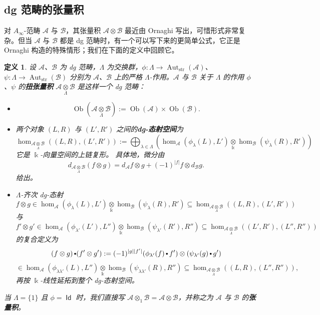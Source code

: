 \documentclass[11pt,a4paper]{article}
\renewcommand{\emph}[1]{{\bfseries #1}}
\DeclareMathOperator{\id}{\mathsf{Id}}
\DeclareMathOperator{\Aut}{Aut}
\DeclareMathOperator{\Ob}{Ob}
\DeclareMathOperator{\field}{\mathbb{k}}
\DeclareMathOperator{\str}{\operatorname{str}}
\DeclareMathOperator{\comp}{\vcenter{\hbox{\scalebox{0.65}{$\bullet$}}}}
\theoremstyle{cnth}
\newtheorem{dfn}[thm]{定义}
\begin{document}
\subsection{dg 范畴的张量积}
对 $A_{\infty}$-范畴 $\mathcal{A}$ 与 $\mathcal{B}$，其张量积 $\mathcal{A}\otimes\mathcal{B}$ 最近由 Ornaghi \cite{Ornaghi25} 写出，可惜形式非常复杂。但当 $\mathcal{A}$ 与 $\mathcal{B}$ 都是 dg 范畴时，有一个可以写下来的更简单公式，它正是 Ornaghi 构造的特殊情形；我们在下面的定义中回顾它。
\begin{dfn}
设 $\mathcal{A}$、$\mathcal{B}$ 为 dg 范畴，$\Lambda$ 为交换群，$\phi:\Lambda\rightarrow\Aut_{\str}(\mathcal{A})$、$\psi:\Lambda\rightarrow\Aut_{\str}(\mathcal{B})$ 分别为 $\mathcal{A}$、$\mathcal{B}$ 上的严格 $\Lambda$-作用。$\mathcal{A}$ 与 $\mathcal{B}$ 关于 $\Lambda$ 的作用 $\phi$、$\psi$ 的\emph{扭张量积} $\mathcal{A}\underset{\Lambda}{\otimes}\mathcal{B}$ 是这样一个 dg 范畴：

\begin{itemize}
\item
$$
\Ob\left(\mathcal{A}\underset{\Lambda}{\otimes}\mathcal{B}\right)
:=
\Ob(\mathcal{A})\times \Ob(\mathcal{B}).
$$

\item
两个对象 $(L,R)$ 与 $(L',R')$ 之间的\emph{dg-态射空间}为
$$
\hom_{\mathcal{A}\underset{\Lambda}{\otimes}\mathcal{B}}
\left((L,R),(L',R')\right)
:=
\displaystyle\bigoplus_{\lambda\in\Lambda}
\left(
\hom_{\mathcal{A}}(\phi_{\lambda}(L),L')
\underset{\field}{\otimes}
\hom_{\mathcal{B}}(\psi_{\lambda}(R),R')
\right)
$$
它是 $\field$-向量空间的上链复形。
具体地，微分由
$$
d_{\mathcal{A}\underset{\Lambda}{\otimes}\mathcal{B}}
(f\otimes g)
=
d_{\mathcal{A}}f \otimes g
+
(-1)^{|f|}
f \otimes d_{\mathcal{B}}g.
$$
给出。

\item
$\Lambda$-齐次 dg-态射
$$
f\otimes g
\in
\hom_{\mathcal{A}}(\phi_{\lambda}(L),L')
\underset{\field}{\otimes}
\hom_{\mathcal{B}}(\psi_{\lambda}(R),R')
\subseteq
\hom_{\mathcal{A}\underset{\Lambda}{\otimes}\mathcal{B}}
\left((L,R),(L',R')\right)
$$
与
$$
f'\otimes g'
\in
\hom_{\mathcal{A}}(\phi_{\lambda'}(L'),L'')
\underset{\field}{\otimes}
\hom_{\mathcal{B}}(\psi_{\lambda'}(R'),R'')
\subseteq
\hom_{\mathcal{A}\underset{\Lambda}{\otimes}\mathcal{B}}
\left((L',R'),(L'',R'')\right)
$$
的复合定义为
$$
(f\otimes g)\comp(f'\otimes g')
:=
(-1)^{|g||f'|}
(\phi_{\lambda'}(f)\comp f')
\otimes
(\psi_{\lambda'}(g)\comp g')
$$
$$
\in
\hom_{\mathcal{A}}(\phi_{\lambda\lambda'}(L),L'')
\underset{\field}{\otimes}
\hom_{\mathcal{B}}(\psi_{\lambda\lambda'}(R),R'')
\subseteq
\hom_{\mathcal{A}\underset{\Lambda}{\otimes}\mathcal{B}}
\left((L,R),(L'',R'')\right),
$$
再按 $\field$-线性延拓到整个 dg-态射空间。
\end{itemize}
当 $\Lambda=\{1\}$ 且 $\phi=\id$ 时，我们直接写 $\mathcal{A}\otimes_1\mathcal{B} =\mathcal{A}\otimes\mathcal{B}$，并称之为 $\mathcal{A}$ 与 $\mathcal{B}$ 的\emph{张量积}。
\end{dfn}
\end{document}

